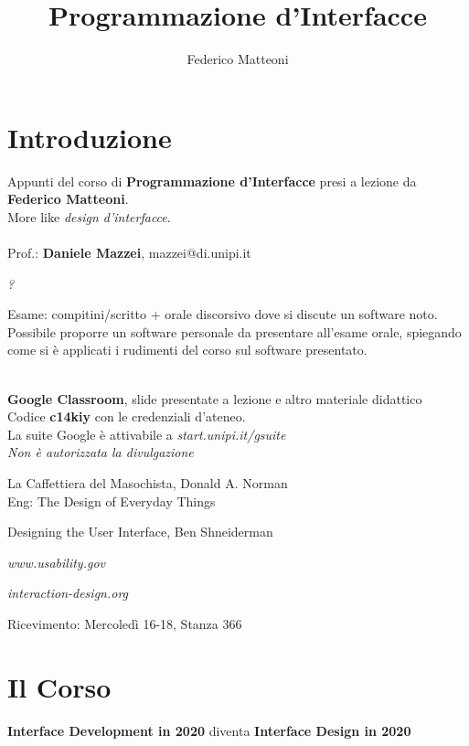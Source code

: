 \documentclass[10pt]{article}
\begin{document}
\title{Programmazione d'Interfacce}
\author{Federico Matteoni}
\date{ }
\renewcommand*\contentsname{Indice}

\maketitle
\tableofcontents
\pagebreak
\section{Introduzione}
Appunti del corso di \textbf{Programmazione d'Interfacce} presi a lezione da \textbf{Federico Matteoni}.\\More like \textit{design d'interfacce}.\\\\
Prof.: \textbf{Daniele Mazzei}, mazzei@di.unipi.it\\
\begin{list}{-}{Riferimenti web:}
\item \emph{?}
\end{list}
Esame: compitini/scritto + orale discorsivo dove si discute un software noto.\\Possibile proporre un software personale da presentare all'esame orale, spiegando come si è applicati i rudimenti del corso sul software presentato.\\\\
\begin{list}{-}{Materiale didattico:}
\item \textbf{Google Classroom}, slide presentate a lezione e altro materiale didattico\\Codice \textbf{c14kiy} con le credenziali d'ateneo.\\La suite Google è attivabile a \emph{start.unipi.it/gsuite}\\\textit{Non è autorizzata la divulgazione}
\item La Caffettiera del Masochista, Donald A. Norman\\Eng: The Design of Everyday Things
\item Designing the User Interface, Ben Shneiderman
\item \emph{www.usability.gov}
\item \emph{interaction-design.org}
\end{list}
Ricevimento: Mercoledì 16-18, Stanza 366\\

\section{Il Corso}
\textbf{Interface Development in 2020} diventa \textbf{Interface Design in 2020}
\end{document}
